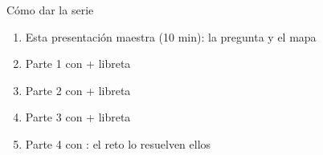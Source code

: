 \documentclass[aspectratio=169]{beamer}
\begin{document}
\begin{frame}{Cómo dar la serie}
  \begin{enumerate}
    \item Esta presentación maestra (10 min): la pregunta y el mapa
    \item Parte 1 con  + libreta
    \item Parte 2 con  + libreta
    \item Parte 3 con  + libreta
    \item Parte 4 con : el reto lo resuelven ellos
  \end{enumerate}
\end{frame}
\end{document}
